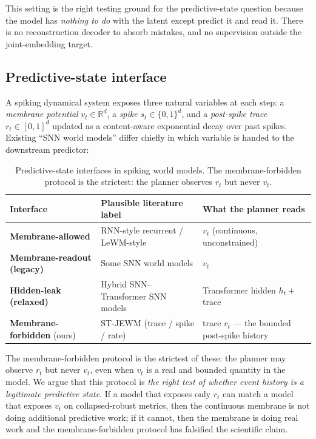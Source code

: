 \documentclass{article}
\begin{document}
This setting is the right testing ground for the predictive-state question because the model has \emph{nothing to do} with the latent except predict it and read it. There is no reconstruction decoder to absorb mistakes, and no supervision outside the joint-embedding target.

\subsection{Predictive-state interface}

A spiking dynamical system exposes three natural variables at each step: a \emph{membrane potential} $v_t \in \mathbb{R}^d$, a \emph{spike} $s_t \in \{0,1\}^d$, and a \emph{post-spike trace} $r_t \in [0,1]^d$ updated as a content-aware exponential decay over past spikes. Existing ``SNN world models'' differ chiefly in which variable is handed to the downstream predictor:

\begin{table}[ht]
\centering
\small
\begin{tabular}{lll}
\toprule
Interface & Plausible literature label & What the planner reads \\
\midrule
\textbf{Membrane-allowed} & RNN-style recurrent / LeWM-style & $v_t$ (continuous, unconstrained) \\
\textbf{Membrane-readout (legacy)} & Some SNN world models & $v_t$ \\
\textbf{Hidden-leak (relaxed)} & Hybrid SNN--Transformer SNN models & Transformer hidden $h_t + $ trace \\
\textbf{Membrane-forbidden} (ours) & ST-JEWM (trace / spike / rate) & trace $r_t$ --- the bounded post-spike history \\
\bottomrule
\end{tabular}
\caption{Predictive-state interfaces in spiking world models. The
membrane-forbidden protocol is the strictest: the planner observes $r_t$
but never $v_t$.}
\label{tab:interfaces}
\end{table}

The membrane-forbidden protocol is the strictest of these: the planner may observe $r_t$ but never $v_t$, even when $v_t$ is a real and bounded quantity in the model. We argue that this protocol is \emph{the right test of whether event history is a legitimate predictive state}. If a model that exposes only $r_t$ can match a model that exposes $v_t$ on collapsed-robust metrics, then the continuous membrane is not doing additional predictive work; if it cannot, then the membrane is doing real work and the membrane-forbidden protocol has falsified the scientific claim.
\end{document}
